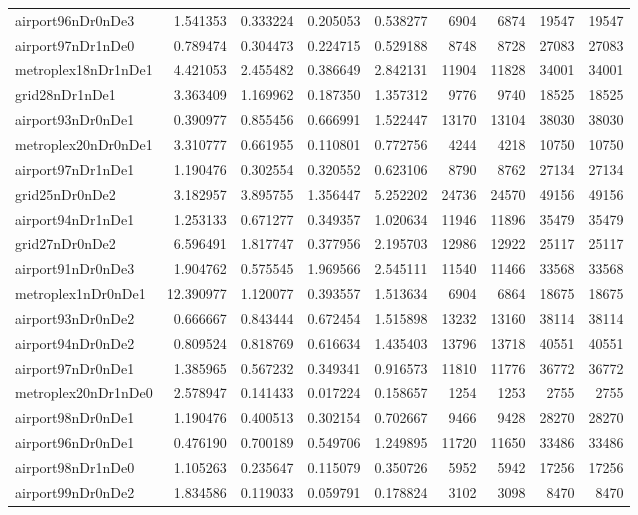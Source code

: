 \begin{longtable}{|l|r|r|r|r|r|r|r|r|}
airport96nDr0nDe3 & 1.541353 & 0.333224 & 0.205053 & 0.538277 & 6904 & 6874 & 19547 & 19547 \\
airport97nDr1nDe0 & 0.789474 & 0.304473 & 0.224715 & 0.529188 & 8748 & 8728 & 27083 & 27083 \\
metroplex18nDr1nDe1 & 4.421053 & 2.455482 & 0.386649 & 2.842131 & 11904 & 11828 & 34001 & 34001 \\
grid28nDr1nDe1 & 3.363409 & 1.169962 & 0.187350 & 1.357312 & 9776 & 9740 & 18525 & 18525 \\
airport93nDr0nDe1 & 0.390977 & 0.855456 & 0.666991 & 1.522447 & 13170 & 13104 & 38030 & 38030 \\
metroplex20nDr0nDe1 & 3.310777 & 0.661955 & 0.110801 & 0.772756 & 4244 & 4218 & 10750 & 10750 \\
airport97nDr1nDe1 & 1.190476 & 0.302554 & 0.320552 & 0.623106 & 8790 & 8762 & 27134 & 27134 \\
grid25nDr0nDe2 & 3.182957 & 3.895755 & 1.356447 & 5.252202 & 24736 & 24570 & 49156 & 49156 \\
airport94nDr1nDe1 & 1.253133 & 0.671277 & 0.349357 & 1.020634 & 11946 & 11896 & 35479 & 35479 \\
grid27nDr0nDe2 & 6.596491 & 1.817747 & 0.377956 & 2.195703 & 12986 & 12922 & 25117 & 25117 \\
airport91nDr0nDe3 & 1.904762 & 0.575545 & 1.969566 & 2.545111 & 11540 & 11466 & 33568 & 33568 \\
metroplex1nDr0nDe1 & 12.390977 & 1.120077 & 0.393557 & 1.513634 & 6904 & 6864 & 18675 & 18675 \\
airport93nDr0nDe2 & 0.666667 & 0.843444 & 0.672454 & 1.515898 & 13232 & 13160 & 38114 & 38114 \\
airport94nDr0nDe2 & 0.809524 & 0.818769 & 0.616634 & 1.435403 & 13796 & 13718 & 40551 & 40551 \\
airport97nDr0nDe1 & 1.385965 & 0.567232 & 0.349341 & 0.916573 & 11810 & 11776 & 36772 & 36772 \\
metroplex20nDr1nDe0 & 2.578947 & 0.141433 & 0.017224 & 0.158657 & 1254 & 1253 & 2755 & 2755 \\
airport98nDr0nDe1 & 1.190476 & 0.400513 & 0.302154 & 0.702667 & 9466 & 9428 & 28270 & 28270 \\
airport96nDr0nDe1 & 0.476190 & 0.700189 & 0.549706 & 1.249895 & 11720 & 11650 & 33486 & 33486 \\
airport98nDr1nDe0 & 1.105263 & 0.235647 & 0.115079 & 0.350726 & 5952 & 5942 & 17256 & 17256 \\
airport99nDr0nDe2 & 1.834586 & 0.119033 & 0.059791 & 0.178824 & 3102 & 3098 & 8470 & 8470 \\

\end{longtable}
